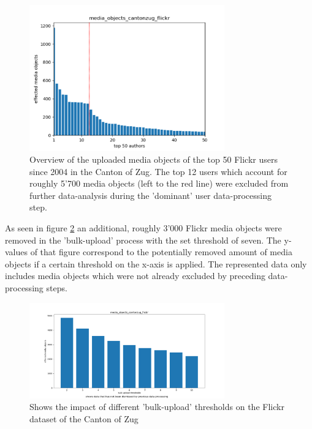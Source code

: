 \begin{figure}[h!]
   \centering
   \includegraphics[width=0.75\textwidth]{img/cantonzug_flickr_top50_w_line}
   \caption{Overview of the uploaded media objects of the top 50 Flickr users since 2004 in the Canton of Zug. The top 12 users which account for roughly 5'700 media objects (left to the red line) were excluded from further data-analysis during the 'dominant' user data-processing step.}
   \label{img:dominant_users_flickr}
\end{figure}

As seen in figure \ref{img:bulk_uploads_flickr} an additional, roughly 3'000 Flickr media objects were removed in the 'bulk-upload' process with the set threshold of seven. The y-values of that figure correspond to the potentially removed amount of media objects if a certain threshold on the x-axis is applied. The represented data only includes media objects which were not already excluded by preceding data-processing steps.

\begin{figure}[h!]
   \centering
   \includegraphics[width=0.75\textwidth]{img/cantonzug_flickr_bulkuploads_cropped.pdf}
   \caption{Shows the impact of different 'bulk-upload' thresholds on the Flickr dataset of the Canton of Zug}
   \label{img:bulk_uploads_flickr}
\end{figure}

